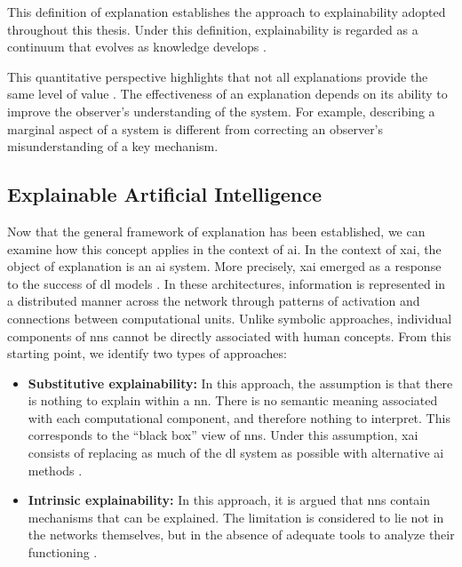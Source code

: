 

This definition of explanation establishes the approach to explainability adopted throughout this thesis.
Under this definition, explainability is regarded as a continuum that evolves as knowledge develops \parencite{Siegel_Craver_2024, zednik2019solving}.

This quantitative perspective highlights that not all explanations provide the same level of value \parencite{doshivelez2017rigorous}.
The effectiveness of an explanation depends on its ability to improve the observer's understanding of the system.
For example, describing a marginal aspect of a system is different from correcting an observer's misunderstanding of a key mechanism.

\subsection{Explainable Artificial Intelligence}
\label{subsec:explainable_artificial_intelligence}

Now that the general framework of explanation has been established, we can examine how this concept applies in the context of \gls{ai}.
In the context of \gls{xai}, the object of explanation is an \gls{ai} system.
More precisely, \gls{xai} emerged as a response to the success of \gls{dl} models \parencite{gunning2019darpa, arrieta2020explainable}.
In these architectures, information is represented in a distributed manner across the network through patterns of activation and connections between computational units.
Unlike symbolic approaches, individual components of \glspl{nn} cannot be directly associated with human concepts.
From this starting point, we identify two types of approaches:
\begin{itemize}
    \item \textbf{Substitutive explainability:} In this approach, the assumption is that there is nothing to explain within a \gls{nn}.
    There is no semantic meaning associated with each computational component, and therefore nothing to interpret.
    This corresponds to the \enquote{black box} view of \glspl{nn}.
    Under this assumption, \gls{xai} consists of replacing as much of the \gls{dl} system as possible with alternative \gls{ai} methods \parencite{rudin2019stop}.

    \item \textbf{Intrinsic explainability:} In this approach, it is argued that \glspl{nn} contain mechanisms that can be explained.
    The limitation is considered to lie not in the networks themselves, but in the absence of adequate tools to analyze their functioning \parencite{olah2020zoom}.
\end{itemize}

